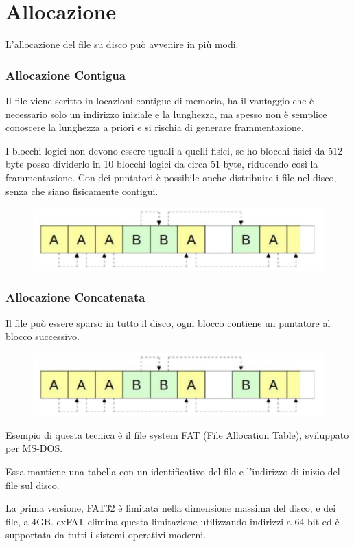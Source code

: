 \section{Allocazione}
L'allocazione del file su disco può avvenire in più modi.

\subsubsection{Allocazione Contigua}
Il file viene scritto in locazioni contigue di memoria, ha il vantaggio che è necessario solo un indirizzo iniziale e la lunghezza, ma spesso non è semplice conoscere la lunghezza a priori e si rischia di generare frammentazione.

I blocchi logici non devono essere uguali a quelli fisici, se ho blocchi fisici da 512 byte posso dividerlo in 10 blocchi logici da circa 51 byte, riducendo così la frammentazione. Con dei puntatori è possibile anche distribuire i file nel disco, senza che siano fisicamente contigui.

\begin{figure}[H]
    \centering
    \includegraphics[width=0.4\linewidth]{assets/allocazione-contigua.jpeg}
\end{figure}

\subsubsection{Allocazione Concatenata}
Il file può essere sparso in tutto il disco, ogni blocco contiene un puntatore al blocco successivo.

\begin{figure}[H]
    \centering
    \includegraphics[width=0.4\linewidth]{assets/allocazione-contigua.jpeg}
\end{figure}


Esempio di questa tecnica è il file system FAT (File Allocation Table), sviluppato per MS-DOS.

Essa mantiene una tabella con un identificativo del file e l'indirizzo di inizio del file sul disco.

\spacer
La prima versione, FAT32 è limitata nella dimensione massima del disco, e dei file, a 4GB. exFAT elimina questa limitazione utilizzando indirizzi a 64 bit ed è supportata da tutti i sistemi operativi moderni.

